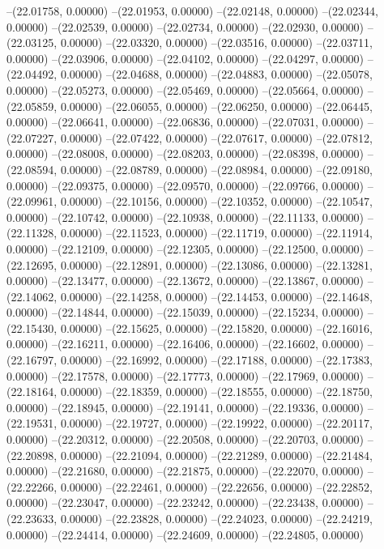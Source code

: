 --(22.01758, 0.00000)
--(22.01953, 0.00000)
--(22.02148, 0.00000)
--(22.02344, 0.00000)
--(22.02539, 0.00000)
--(22.02734, 0.00000)
--(22.02930, 0.00000)
--(22.03125, 0.00000)
--(22.03320, 0.00000)
--(22.03516, 0.00000)
--(22.03711, 0.00000)
--(22.03906, 0.00000)
--(22.04102, 0.00000)
--(22.04297, 0.00000)
--(22.04492, 0.00000)
--(22.04688, 0.00000)
--(22.04883, 0.00000)
--(22.05078, 0.00000)
--(22.05273, 0.00000)
--(22.05469, 0.00000)
--(22.05664, 0.00000)
--(22.05859, 0.00000)
--(22.06055, 0.00000)
--(22.06250, 0.00000)
--(22.06445, 0.00000)
--(22.06641, 0.00000)
--(22.06836, 0.00000)
--(22.07031, 0.00000)
--(22.07227, 0.00000)
--(22.07422, 0.00000)
--(22.07617, 0.00000)
--(22.07812, 0.00000)
--(22.08008, 0.00000)
--(22.08203, 0.00000)
--(22.08398, 0.00000)
--(22.08594, 0.00000)
--(22.08789, 0.00000)
--(22.08984, 0.00000)
--(22.09180, 0.00000)
--(22.09375, 0.00000)
--(22.09570, 0.00000)
--(22.09766, 0.00000)
--(22.09961, 0.00000)
--(22.10156, 0.00000)
--(22.10352, 0.00000)
--(22.10547, 0.00000)
--(22.10742, 0.00000)
--(22.10938, 0.00000)
--(22.11133, 0.00000)
--(22.11328, 0.00000)
--(22.11523, 0.00000)
--(22.11719, 0.00000)
--(22.11914, 0.00000)
--(22.12109, 0.00000)
--(22.12305, 0.00000)
--(22.12500, 0.00000)
--(22.12695, 0.00000)
--(22.12891, 0.00000)
--(22.13086, 0.00000)
--(22.13281, 0.00000)
--(22.13477, 0.00000)
--(22.13672, 0.00000)
--(22.13867, 0.00000)
--(22.14062, 0.00000)
--(22.14258, 0.00000)
--(22.14453, 0.00000)
--(22.14648, 0.00000)
--(22.14844, 0.00000)
--(22.15039, 0.00000)
--(22.15234, 0.00000)
--(22.15430, 0.00000)
--(22.15625, 0.00000)
--(22.15820, 0.00000)
--(22.16016, 0.00000)
--(22.16211, 0.00000)
--(22.16406, 0.00000)
--(22.16602, 0.00000)
--(22.16797, 0.00000)
--(22.16992, 0.00000)
--(22.17188, 0.00000)
--(22.17383, 0.00000)
--(22.17578, 0.00000)
--(22.17773, 0.00000)
--(22.17969, 0.00000)
--(22.18164, 0.00000)
--(22.18359, 0.00000)
--(22.18555, 0.00000)
--(22.18750, 0.00000)
--(22.18945, 0.00000)
--(22.19141, 0.00000)
--(22.19336, 0.00000)
--(22.19531, 0.00000)
--(22.19727, 0.00000)
--(22.19922, 0.00000)
--(22.20117, 0.00000)
--(22.20312, 0.00000)
--(22.20508, 0.00000)
--(22.20703, 0.00000)
--(22.20898, 0.00000)
--(22.21094, 0.00000)
--(22.21289, 0.00000)
--(22.21484, 0.00000)
--(22.21680, 0.00000)
--(22.21875, 0.00000)
--(22.22070, 0.00000)
--(22.22266, 0.00000)
--(22.22461, 0.00000)
--(22.22656, 0.00000)
--(22.22852, 0.00000)
--(22.23047, 0.00000)
--(22.23242, 0.00000)
--(22.23438, 0.00000)
--(22.23633, 0.00000)
--(22.23828, 0.00000)
--(22.24023, 0.00000)
--(22.24219, 0.00000)
--(22.24414, 0.00000)
--(22.24609, 0.00000)
--(22.24805, 0.00000)
